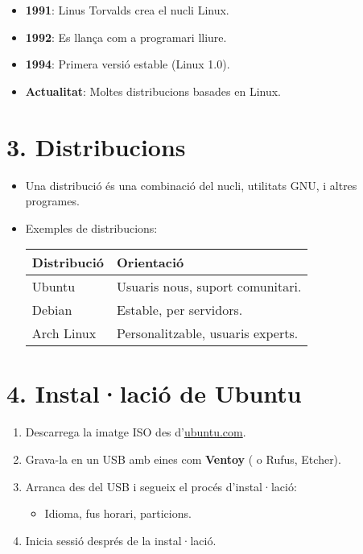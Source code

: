 \documentclass[
  a4paper,
]{article}
\providecommand{\tightlist}{%
  \setlength{\itemsep}{0pt}\setlength{\parskip}{0pt}}
\begin{document}
\begin{itemize}
\tightlist
\item
  \textbf{1991}: Linus Torvalds crea el nucli Linux.
\item
  \textbf{1992}: Es llança com a programari lliure.
\item
  \textbf{1994}: Primera versió estable (Linux 1.0).
\item
  \textbf{Actualitat}: Moltes distribucions basades en Linux.
\end{itemize}

\section{3. Distribucions}\label{distribucions}

\begin{itemize}
\item
  Una distribució és una combinació del nucli, utilitats GNU, i altres
  programes.
\item
  Exemples de distribucions:

  \begin{longtable}[]{@{}ll@{}}
  \toprule\noalign{}
  \textbf{Distribució} & \textbf{Orientació} \\
  \midrule\noalign{}
  \endhead
  \bottomrule\noalign{}
  \endlastfoot
  Ubuntu & Usuaris nous, suport comunitari. \\
  Debian & Estable, per servidors. \\
  Arch Linux & Personalitzable, usuaris experts. \\
  \end{longtable}
\end{itemize}

\section{4. Instal·lació de Ubuntu}\label{installaciuxf3-de-ubuntu}

\begin{enumerate}
\def\labelenumi{\arabic{enumi}.}
\tightlist
\item
  Descarrega la imatge ISO des d'\href{https://ubuntu.com/}{ubuntu.com}.
\item
  Grava-la en un USB amb eines com \textbf{Ventoy} ( o Rufus, Etcher).
\item
  Arranca des del USB i segueix el procés d'instal·lació:

  \begin{itemize}
  \tightlist
  \item
    Idioma, fus horari, particions.
  \end{itemize}
\item
  Inicia sessió després de la instal·lació.
\end{enumerate}
\end{document}
